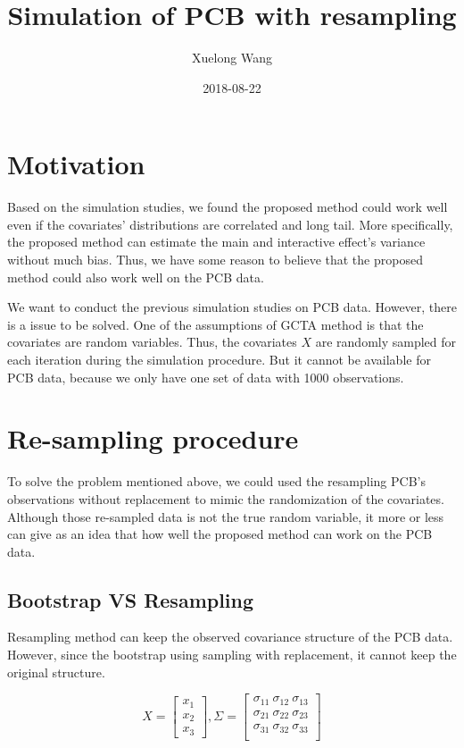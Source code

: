 \documentclass[]{article}
\title{Simulation of PCB with resampling}
\author{Xuelong Wang}
\date{2018-08-22}
\begin{document}
\maketitle

{
\setcounter{tocdepth}{2}
\tableofcontents
}
\section{Motivation}\label{motivation}

Based on the simulation studies, we found the proposed method could work
well even if the covariates' distributions are correlated and long tail.
More specifically, the proposed method can estimate the main and
interactive effect's variance without much bias. Thus, we have some
reason to believe that the proposed method could also work well on the
PCB data.

We want to conduct the previous simulation studies on PCB data. However,
there is a issue to be solved. One of the assumptions of GCTA method is
that the covariates are random variables. Thus, the covariates \(X\) are
randomly sampled for each iteration during the simulation procedure. But
it cannot be available for PCB data, because we only have one set of
data with 1000 observations.

\section{Re-sampling procedure}\label{re-sampling-procedure}

To solve the problem mentioned above, we could used the resampling PCB's
observations without replacement to mimic the randomization of the
covariates. Although those re-sampled data is not the true random
variable, it more or less can give as an idea that how well the proposed
method can work on the PCB data.

\subsection{Bootstrap VS Resampling}\label{bootstrap-vs-resampling}

Resampling method can keep the observed covariance structure of the PCB
data. However, since the bootstrap using sampling with replacement, it
cannot keep the original structure.

\[
  X = \begin{bmatrix}   
        x_1\\
        x_2\\
        x_3
      \end{bmatrix},
  \Sigma = \begin{bmatrix}   
        \sigma_{11} ~ \sigma_{12} ~ \sigma_{13}\\
        \sigma_{21} ~ \sigma_{22} ~ \sigma_{23}\\
        \sigma_{31} ~ \sigma_{32} ~ \sigma_{33}\\
      \end{bmatrix}
\]
\end{document}
